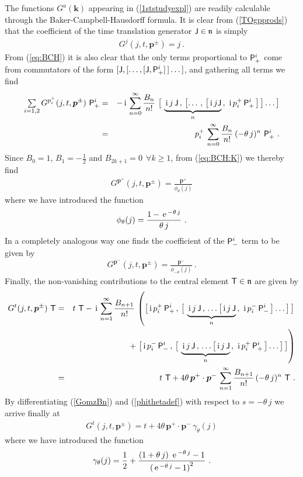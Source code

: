 \documentclass[11pt,a4paper]{article}
\newcommand{\mbf}[1]{{\boldsymbol {#1} }}
\def\ii{{\,{\rm i}\,}}
\def\P{{\sf P}}
\def\T{{\sf T}}
\def\J{{\sf J}}
\def\mk{{\mbf k}}
\def\mbp{{\mbf p}}
\def\mfn{{\mathfrak n}}
\def\e{{\,\rm e}\,}
\def\bea{\begin{eqnarray}}
\def\eea{\end{eqnarray}}
\newcommand{\beq}{\begin{eqnarray}}
\newcommand{\eeq}{\end{eqnarray}}
\begin{document}
The functions $G^a(\mk)$ appearing in (\ref{1ststudyexpl}) are readily
calculable through the Baker-Campbell-Hausdorff formula. It is clear
from (\ref{TOgpprods}) that the coefficient of the time translation
generator $\J\in\mfn$ is simply
\beq
G^j(j,t,\mbp^\pm)=j \ .
\label{Gj}\eeq
From (\ref{eq:BCH}) it is also clear that the only terms proportional
to $\P^i_+$ come from commutators of the form
$[\J,[\dots,[\J,\P^i_+]\,]\dots]$, and gathering all terms we find
\bea
\mbox{$\sum\limits_{i=1,2}$}\,
G^{p_i^+}(j,t,\mbp^\pm)~\P^i_+&=&-\ii\sum_{n=0}^\infty
\frac{B_n}{n!}~\bigl[~\underbrace{\ii j\,\J\,,\,\bigl[\dots\,,\,
\bigl[\ii j\J}_n\,,\,\ii p_i^+\,\P^i_+\,\bigr]\,\bigr]
\dots\bigr]\nonumber\\ &=&
p_i^+\,\sum_{n=0}^\infty\frac{B_n}{n!}\,
(-\theta\,j)^n~\P^i_+ \ .
\label{GomzBn}\eea
Since $B_0=1$, $B_1=-\frac12$ and $B_{2k+1}=0~~\forall k\geq1$, from
(\ref{eq:BCH:K}) we thereby find
\beq
G^{\mbp^+}(j,t,\mbp^\pm)=\frac{\mbp^+}
{\phi_\theta(j)}
\label{Gomz}\eeq
where we have introduced the function
\beq
\phi_\theta(j)=\frac{1-\e^{-\theta\,j}}{\theta\,j} \ .
\label{phithetadef}\eeq
In a completely analogous way one finds the coefficient of the
$\P^i_-$ term to be given by
\beq
G^{\mbp^-}(j,t,\mbp^\pm)=\frac{\mbp^-}
{{\phi_{-\theta}(j)}} \ .
\label{Gmz}\eeq
Finally, the non-vanishing contributions to the central
element $\T\in\mfn$ are given by
\bea
G^t(j,t,\mbp^\pm)~\T&=&
t~\T-\ii\sum_{n=1}^\infty\frac{B_{n+1}}{n!}\,
\left(\bigl[\ii p_i^+\,\P^i_+\,,\,\bigl[~
\underbrace{\ii j\,\J\,,\,\dots\bigl[\ii j\,\J}_n\,,\,\ii p_i^-\,
\P^i_-\,\bigr]\dots\bigr]\,\bigr]\right.\nonumber\\ &&\qquad\qquad\qquad
+\left.\bigl[\ii p_i^-\,\P^i_-\,,\,\bigl[~
\underbrace{\ii j\,\J\,,\,\dots\bigl[\ii j\,\J}_n\,,\,
\ii p_i^+\,\P^i_+\,\bigr]\dots\bigr]\,\bigr]\right)
\nonumber\\ &=&t~\T+4\theta\,\mbp^+\cdot\mbp^-\,\sum_{n=1}^\infty\frac{B_{n+1}}
{n!}\,(-\theta\,j)^n~\T \ .
\label{GtBn}\eea
By differentiating (\ref{GomzBn}) and (\ref{phithetadef}) with respect
to $s=-\theta\,j$ we arrive finally at
\beq
G^t(j,t,\mbp^\pm)=t+4\theta\,\mbp^+\cdot\mbp^-\,
\gamma_\theta(j)
\label{Gt}\eeq
where we have introduced the function
\beq
\gamma_\theta(j)=\frac12+\frac{(1+\theta\,j)~\e^{-\theta\,j}-1}
{\left(\e^{-\theta\,j}-1\right)^2} \ .
\label{gammathetadef}\eeq
\end{document}
